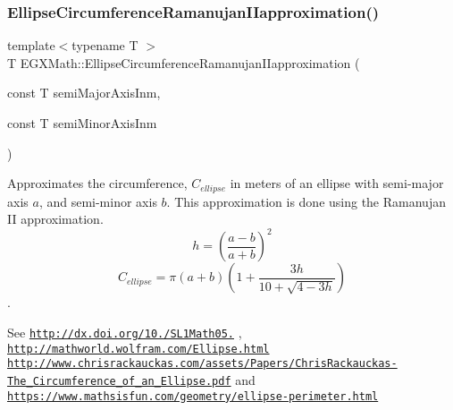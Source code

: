 \subsubsection{\texorpdfstring{Ellipse\+Circumference\+Ramanujan\+I\+Iapproximation()}{EllipseCircumferenceRamanujanIIapproximation()}}
{\footnotesize\ttfamily template$<$typename T $>$ \\
T E\+G\+X\+Math\+::\+Ellipse\+Circumference\+Ramanujan\+I\+Iapproximation (\begin{DoxyParamCaption}\item[{const T}]{semi\+Major\+Axis\+Inm,  }\item[{const T}]{semi\+Minor\+Axis\+Inm }\end{DoxyParamCaption})}



Approximates the circumference, $C_{ellipse}$ in meters of an ellipse with semi-\/major axis $a$, and semi-\/minor axis $b$. This approximation is done using the Ramanujan II approximation. \[ h=\left( \frac{a-b}{a+b} \right)^2 \] \[ C_{ellipse}=\pi (a + b) \left( 1+\frac{3h}{10+\sqrt{4-3h}} \right) \]. 

See \href{http://dx.doi.org/10.3247/SL1Math05.004}{\tt http\+://dx.\+doi.\+org/10./\+S\+L1\+Math05.} , \href{http://mathworld.wolfram.com/Ellipse.html}{\tt http\+://mathworld.\+wolfram.\+com/\+Ellipse.\+html} \href{http://www.chrisrackauckas.com/assets/Papers/ChrisRackauckas-The_Circumference_of_an_Ellipse.pdf}{\tt http\+://www.\+chrisrackauckas.\+com/assets/\+Papers/\+Chris\+Rackauckas-\/\+The\+\_\+\+Circumference\+\_\+of\+\_\+an\+\_\+\+Ellipse.\+pdf} and \href{https://www.mathsisfun.com/geometry/ellipse-perimeter.html}{\tt https\+://www.\+mathsisfun.\+com/geometry/ellipse-\/perimeter.\+html}

